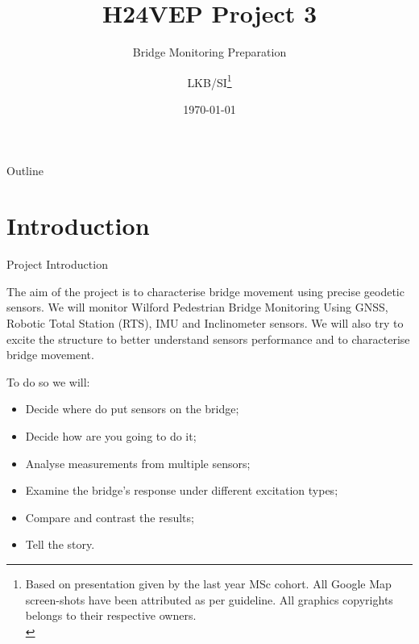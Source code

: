 \documentclass[11pt]{beamer}
\title[H24VEP]{H24VEP Project 3}
\subtitle{Bridge Monitoring Preparation\thisDocRef}
\author{LKB/SI\footnote{Based on presentation given by the last year MSc cohort. All Google Map screen-shots have been attributed as per guideline. All graphics copyrights belongs to their respective owners.\\}}
\institute{NGI}
\date{\today}
\begin{document}
	
	\begin{frame}
		\titlepage
	\end{frame}
	
	\begin{frame}{Outline}
		\tableofcontents
	\end{frame}
	
\section{Introduction}

\begin{frame}[allowframebreaks]{Project Introduction}

The aim of the project is to characterise bridge movement using precise geodetic sensors. We will monitor Wilford Pedestrian Bridge Monitoring Using GNSS, Robotic Total Station (RTS), IMU and Inclinometer sensors. We will also try to excite the structure to better understand sensors performance and to characterise bridge movement.

To do so we will:

\begin{itemize}
	\item Decide where do put sensors on the bridge;
	\item Decide how are you going to do it;
	\item Analyse measurements from multiple sensors;
	\item Examine the bridge's response under different excitation types;
	\item Compare and contrast the results;
	\item Tell the story.
\end{itemize}
\end{frame}
\end{document}
